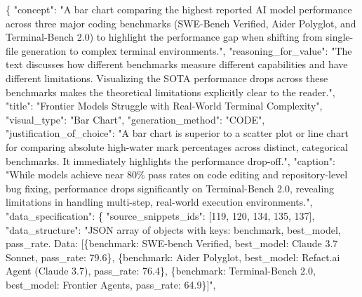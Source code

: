 \documentclass[
  11pt,
]{article}
\newenvironment{Shaded}{}{}
\newcommand{\DataTypeTok}[1]{\textcolor[rgb]{0.56,0.13,0.00}{#1}}
\newcommand{\DecValTok}[1]{\textcolor[rgb]{0.25,0.63,0.44}{#1}}
\newcommand{\FunctionTok}[1]{\textcolor[rgb]{0.02,0.16,0.49}{#1}}
\newcommand{\OtherTok}[1]{\textcolor[rgb]{0.00,0.44,0.13}{#1}}
\newcommand{\StringTok}[1]{\textcolor[rgb]{0.25,0.44,0.63}{#1}}
\begin{document}
\begin{Shaded}
\begin{Highlighting}[]
\FunctionTok{\{}
  \DataTypeTok{"concept"}\FunctionTok{:} \StringTok{"A bar chart comparing the highest reported AI model performance across three major coding benchmarks (SWE{-}Bench Verified, Aider Polyglot, and Terminal{-}Bench 2.0) to highlight the performance gap when shifting from single{-}file generation to complex terminal environments."}\FunctionTok{,}
  \DataTypeTok{"reasoning\_for\_value"}\FunctionTok{:} \StringTok{"The text discusses how different benchmarks measure different capabilities and have different limitations. Visualizing the SOTA performance drops across these benchmarks makes the theoretical limitations explicitly clear to the reader."}\FunctionTok{,}
  \DataTypeTok{"title"}\FunctionTok{:} \StringTok{"Frontier Models Struggle with Real{-}World Terminal Complexity"}\FunctionTok{,}
  \DataTypeTok{"visual\_type"}\FunctionTok{:} \StringTok{"Bar Chart"}\FunctionTok{,}
  \DataTypeTok{"generation\_method"}\FunctionTok{:} \StringTok{"CODE"}\FunctionTok{,}
  \DataTypeTok{"justification\_of\_choice"}\FunctionTok{:} \StringTok{"A bar chart is superior to a scatter plot or line chart for comparing absolute high{-}water mark percentages across distinct, categorical benchmarks. It immediately highlights the performance drop{-}off."}\FunctionTok{,}
  \DataTypeTok{"caption"}\FunctionTok{:} \StringTok{"While models achieve near 80\% pass rates on code editing and repository{-}level bug fixing, performance drops significantly on Terminal{-}Bench 2.0, revealing limitations in handling multi{-}step, real{-}world execution environments."}\FunctionTok{,}
  \DataTypeTok{"data\_specification"}\FunctionTok{:} \FunctionTok{\{}
    \DataTypeTok{"source\_snippets\_ids"}\FunctionTok{:} \OtherTok{[}\DecValTok{119}\OtherTok{,} \DecValTok{120}\OtherTok{,} \DecValTok{134}\OtherTok{,} \DecValTok{135}\OtherTok{,} \DecValTok{137}\OtherTok{]}\FunctionTok{,}
    \DataTypeTok{"data\_structure"}\FunctionTok{:} \StringTok{"JSON array of objects with keys: \textquotesingle{}benchmark\textquotesingle{}, \textquotesingle{}best\_model\textquotesingle{}, \textquotesingle{}pass\_rate\textquotesingle{}. Data: [\{\textquotesingle{}benchmark\textquotesingle{}: \textquotesingle{}SWE{-}bench Verified\textquotesingle{}, \textquotesingle{}best\_model\textquotesingle{}: \textquotesingle{}Claude 3.7 Sonnet\textquotesingle{}, \textquotesingle{}pass\_rate\textquotesingle{}: 79.6\}, \{\textquotesingle{}benchmark\textquotesingle{}: \textquotesingle{}Aider Polyglot\textquotesingle{}, \textquotesingle{}best\_model\textquotesingle{}: \textquotesingle{}Refact.ai Agent (Claude 3.7)\textquotesingle{}, \textquotesingle{}pass\_rate\textquotesingle{}: 76.4\}, \{\textquotesingle{}benchmark\textquotesingle{}: \textquotesingle{}Terminal{-}Bench 2.0\textquotesingle{}, \textquotesingle{}best\_model\textquotesingle{}: \textquotesingle{}Frontier Agents\textquotesingle{}, \textquotesingle{}pass\_rate\textquotesingle{}: 64.9\}]"}\FunctionTok{,}

\end{Highlighting}
\end{Shaded}
\end{document}

